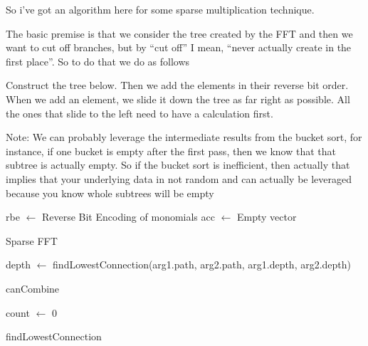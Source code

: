 So i've got an algorithm here for some sparse multiplication technique.

The basic premise is that we consider the tree created by the FFT and then we want to cut off branches, but by ``cut off'' I mean, ``never actually create in the first place''. So to do that we do as follows

Construct the tree below.
Then we add the elements in their reverse bit order. When we add an element, we slide it down the tree as far right as possible. All the ones that slide to the left need to have a calculation first.

Note: We can probably leverage the intermediate results from the bucket sort, for instance, if one bucket is empty after the first pass, then we know that that subtree is actually empty. So if the bucket sort is inefficient, then actually that implies that your underlying data in not random and can actually be leveraged because you know whole subtrees will be empty

\begin{algorithm}[H]
  \SetAlgoLined
  rbe $\gets$ Reverse Bit Encoding of monomials\;
  acc $\gets$ Empty vector\; 
  \caption{Sparse FFT}
\end{algorithm}


\begin{algorithm}[H]
  \SetAlgoLined
  depth $\gets$ findLowestConnection(arg1.path, arg2.path, arg1.depth, arg2.depth)\;
  \;
  \caption{canCombine}
\end{algorithm}

\begin{algorithm}[H]
  \SetAlgoLined
  count $\gets$ 0\;
  \caption{findLowestConnection}
\end{algorithm}

